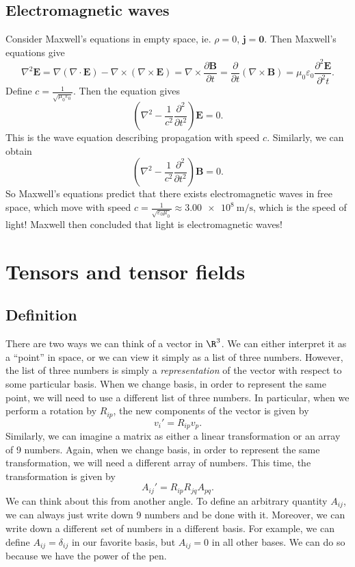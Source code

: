 \documentclass[a4paper]{article}
\begin{document}
\subsection{Electromagnetic waves}
Consider Maxwell's equations in empty space, ie. $\rho = 0$, $\mathbf{j} = \mathbf{0}$. Then Maxwell's equations give
\[
  \nabla^2 \mathbf{E} = \nabla(\nabla\cdot \mathbf{E}) - \nabla\times (\nabla\times \mathbf{E}) = \nabla\times \frac{\partial \mathbf{B}}{\partial t} = \frac{\partial}{\partial t} (\nabla \times \mathbf{B}) = \mu_0\varepsilon_0 \frac{\partial^2 \mathbf{E}}{\partial^2 t}.
\]
Define $c = \frac{1}{\sqrt{\mu_0\varepsilon_0}}$. Then the equation gives
\[
  \left(\nabla^2 - \frac{1}{c^2}\frac{\partial^2}{\partial t^2}\right)\mathbf{E} = 0.
\]
This is the wave equation describing propagation with speed $c$. Similarly, we can obtain
\[
  \left(\nabla^2 - \frac{1}{c^2}\frac{\partial^2}{\partial t^2}\right)\mathbf{B} = 0.
\]
So Maxwell's equations predict that there exists electromagnetic waves in free space, which move with speed $c = \frac{1}{\sqrt{\varepsilon_0 \mu_0}} \approx \SI{3.00e8}{\meter\per\second}$, which is the speed of light! Maxwell then concluded that light is electromagnetic waves!

\section{Tensors and tensor fields}
\subsection{Definition}
There are two ways we can think of a vector in $\R^3$. We can either interpret it as a ``point'' in space, or we can view it simply as a list of three numbers. However, the list of three numbers is simply a \emph{representation} of the vector with respect to some particular basis. When we change basis, in order to represent the same point, we will need to use a different list of three numbers. In particular, when we perform a rotation by $R_{ip}$, the new components of the vector is given by
\[
  v_i' = R_{ip}v_p.
\]
Similarly, we can imagine a matrix as either a linear transformation or an array of 9 numbers. Again, when we change basis, in order to represent the same transformation, we will need a different array of numbers. This time, the transformation is given by
\[
  A_{ij}' = R_{ip}R_{jq}A_{pq}.
\]
We can think about this from another angle. To define an arbitrary quantity $A_{ij}$, we can always just write down 9 numbers and be done with it. Moreover, we can write down a different set of numbers in a different basis. For example, we can define $A_{ij} = \delta_{ij}$ in our favorite basis, but $A_{ij} = 0$ in all other bases. We can do so because we have the power of the pen.
\end{document}

